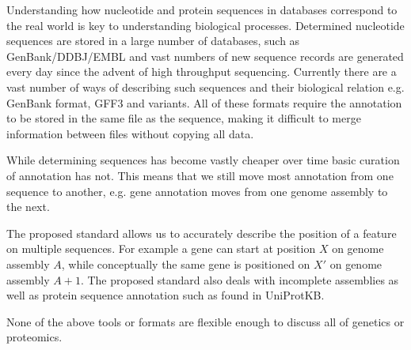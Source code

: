 Understanding how nucleotide and protein sequences in databases correspond to the real world is key to understanding biological processes.
Determined nucleotide sequences are stored in a large number of databases,
such as GenBank/DDBJ/EMBL and vast numbers of new sequence records are generated every day since the advent of high throughput sequencing.
Currently there are a vast number of ways of describing such sequences and their biological relation e.g. GenBank format, GFF3 and variants.
All of these formats require the annotation to be stored in the same file as the sequence,
making it difficult to merge information between files without copying all data.

While determining sequences has become vastly cheaper over time basic curation of annotation has not.
This means that we still move most annotation from one sequence to another,
e.g. gene annotation moves from one genome assembly to the next.

The proposed standard allows us to accurately describe the position of a feature on multiple sequences.
For example a gene can start at position $X$ on genome assembly $A$,
while conceptually the same gene is positioned on $X'$ on genome assembly $A+1$.
The proposed standard also deals with incomplete assemblies as well as protein sequence annotation such as found in UniProtKB.

None of the above tools or formats are flexible enough to discuss all of genetics or proteomics. 

